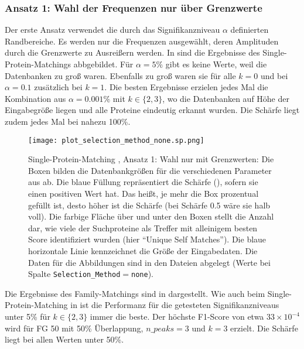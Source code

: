         \subsubsection{Ansatz 1: Wahl der Frequenzen nur über Grenzwerte} %
            \label{ssub:ansatz_1_results}
            Der erste Ansatz verwendet die durch das Signifikanzniveau $\alpha$ definierten Randbereiche. Es werden nur die Frequenzen ausgewählt, deren Amplituden durch die Grenzwerte zu Ausreißern werden. In  sind die Ergebnisse des Single-Protein-Matchings abbgebildet. Für $\alpha=5\%$ gibt es keine Werte, weil die Datenbanken zu groß waren. Ebenfalls zu groß waren sie für alle $k=0$ und bei $\alpha=0.1$ zusätzlich bei $k=1$. Die besten Ergebnisse erzielen jedes Mal die Kombination aus $\alpha=0.001\%$ mit $k \in \{2, 3\}$, wo die Datenbanken auf Höhe der Eingabegröße liegen und alle Proteine eindeutig erkannt wurden. Die Schärfe liegt zudem jedes Mal bei nahezu 100\%.

            \begin{figure}[H]
                \texttt{[image: plot\_selection\_method\_none.sp.png]}
                \caption[Single-Protein-Matching , Ansatz 1: Wahl nur mit Grenzwerten]{Single-Protein-Matching , Ansatz 1: Wahl nur mit Grenzwerten: Die Boxen bilden die Datenbankgrößen für die verschiedenen Parameter aus  ab. Die blaue Füllung repräsentiert die Schärfe (), sofern sie einen positiven Wert hat. Das heißt, je mehr die Box prozentual gefüllt ist, desto höher ist die Schärfe (bei Schärfe 0.5 wäre sie halb voll). Die farbige Fläche über und unter den Boxen stellt die Anzahl dar, wie viele der Suchproteine als Treffer mit alleinigem besten Score identifiziert wurden (hier ``Unique Self Matches''). Die blaue horizontale Linie kennzeichnet die Größe der Eingabedaten. Die Daten für die Abbildungen sind in den Dateien  abgelegt (Werte bei Spalte \texttt{Selection\_Method}$=$\texttt{none}).}
                \label{fig:selection_method.none.sp}
            \end{figure}

            Die Ergebnisse des Family-Matchings sind in  dargestellt. Wie auch beim Single-Protein-Matching in  ist die Performanz für die getesteten Signifikanzniveaus unter 5\% für $k \in \{2, 3\}$ immer die beste. Der höchste F1-Score von etwa $33\times 10^{-4}$ wird für \ac{FG} 50 mit 50\% Überlappung, $n\_peaks=3$ und $k=3$ erzielt. Die Schärfe liegt bei allen Werten unter 50\%.

